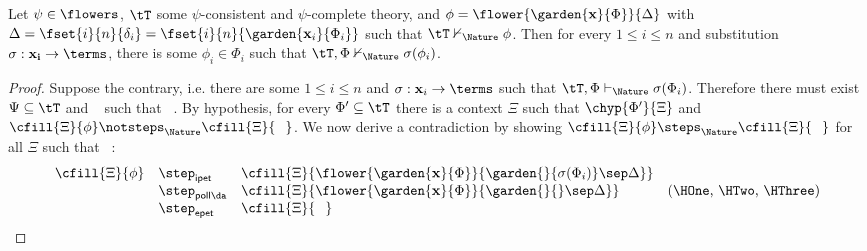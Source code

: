 \begin{proposition}
  
  Let $\psi \in \flowers$, $\tT$ some $\psi$-consistent and $\psi$-complete
  theory, and $\phi = \flower{\garden{\mathbf{x}}{\Phi}}{\Delta}$ with $\Delta
  = \fset{i}{n}{\delta_i} = \fset{i}{n}{\garden{\mathbf{x}_i}{\Phi_i}}$ such
  that $\tT \nvdash_\Nature \phi$. Then for every $1 \leq i \leq n$ and substitution
  $\sigma : \mathbf{x_i} \to \terms$, there is some $\phi_i \in \Phi_i$ such
  that $\tT, \Phi \nvdash_\Nature \sigma(\phi_i)$.
\end{proposition}
\begin{proof}
  Suppose the contrary, i.e. there are some $1 \leq i \leq n$ and $\sigma :
  \mathbf{x}_i \to \terms$ such that $\tT, \Phi \vdash_\Nature \sigma(\Phi_i)$.
  Therefore there must exist $\Psi \subseteq \tT$ and \Hyp{$\Phi_0 \subseteq
  \Phi$}~{\HOne} such that ~{\HTwo}. By hypothesis, for every $\Phi' \subseteq \tT$ there
  is a context $\Xi$ such that $\chyp{\Phi'}{\Xi}$ and $\cfill{\Xi}{\phi}
  \notsteps_\Nature \cfill{\Xi}{\phantom{\Phi}}$. We now derive a contradiction
  by showing $\cfill{\Xi}{\phi} \steps_\Nature \cfill{\Xi}{\phantom{\Phi}}$ for
  all $\Xi$ such that \Hyp{$\chyp{\Psi}{\Xi}$}~{\HThree}:
  $$
  \begin{array}{rlll}
    \cfill{\Xi}{\phi}
    &\step_{\mathsf{ipet}} &\cfill{\Xi}{\flower{\garden{\mathbf{x}}{\Phi}}{\garden{{}}{\sigma(\Phi_i)} \sep \Delta}} & \\
    &\step_{\mathsf{poll}{\da}} &\cfill{\Xi}{\flower{\garden{\mathbf{x}}{\Phi}}{\garden{{}}{{}} \sep \Delta}} &\text{(\HOne, \HTwo, \HThree)} \\
    &\step_{\mathsf{epet}} &\cfill{\Xi}{\phantom{\Phi}} &
  \end{array}
  $$
\end{proof}

